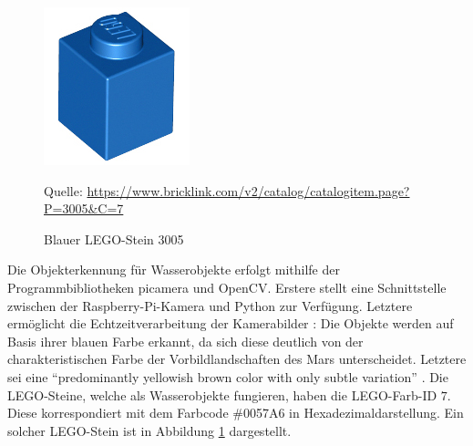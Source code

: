 \begin{figure}
	\centering
	\includegraphics[width=0.9\linewidth]{../Images/3005.png}
	\vspace{0.5em}
	\parbox[c]{0.8\linewidth}{\footnotesize
		\centering
		\vspace{1em}
		Quelle: \url{https://www.bricklink.com/v2/catalog/catalogitem.page?P=3005\&C=7}
	}
	\captionsetup{format=plain}
	\caption{Blauer LEGO-Stein 3005}
	\label{fig:lego3005}
\end{figure}

Die Objekterkennung für Wasserobjekte erfolgt mithilfe der Programmbibliotheken picamera und OpenCV.
Erstere stellt eine Schnittstelle zwischen der Raspberry-Pi-Kamera und Python zur Verfügung.
Letztere ermöglicht die Echtzeitverarbeitung der Kamerabilder \cite{pajankar2015}:
Die Objekte werden auf Basis ihrer blauen Farbe erkannt, da sich diese deutlich von der charakteristischen Farbe der Vorbildlandschaften des Mars unterscheidet.
Letztere sei eine \enquote{predominantly yellowish brown color with only subtle variation} \cite{maki1999}.
Die LEGO-Steine, welche als Wasserobjekte fungieren, haben die LEGO-Farb-ID $7$.
Diese korrespondiert mit dem Farbcode \#0057A6 in Hexadezimaldarstellung.
Ein solcher LEGO-Stein ist in Abbildung \ref{fig:lego3005} dargestellt.

